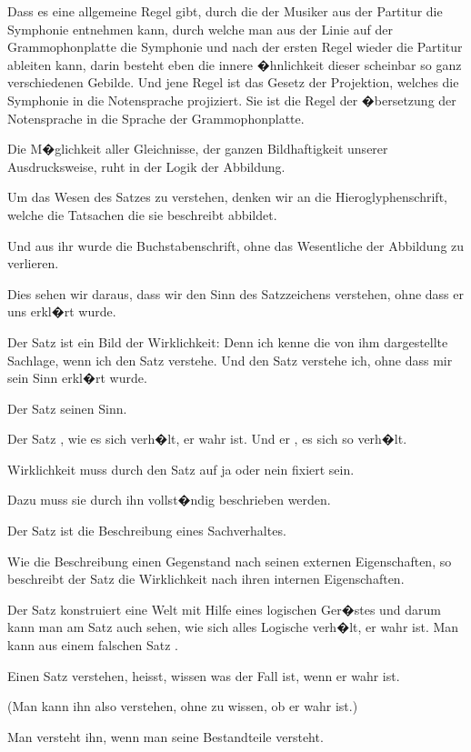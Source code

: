{Dass es eine allgemeine Regel gibt, durch die
der Musiker aus der Partitur die Symphonie
entnehmen kann, durch welche man aus der Linie
auf der Grammophonplatte die Symphonie und
nach der ersten Regel wieder die Partitur ableiten
kann, darin besteht eben die innere �hnlichkeit
dieser scheinbar so ganz verschiedenen Gebilde.
Und jene Regel ist das Gesetz der Projektion,
welches die Symphonie in die Notensprache projiziert.
Sie ist die Regel der �bersetzung der
Notensprache in die Sprache der Grammophonplatte.}


{Die M�glichkeit aller Gleichnisse, der ganzen
Bildhaftigkeit unserer Ausdrucksweise, ruht in der
Logik der Abbildung.}


{Um das Wesen des Satzes zu verstehen, denken
wir an die Hieroglyphenschrift, welche die Tatsachen
die sie beschreibt abbildet.

Und aus ihr wurde die Buchstabenschrift, ohne
das Wesentliche der Abbildung zu verlieren.}


{Dies sehen wir daraus, dass wir den Sinn des
Satzzeichens verstehen, ohne dass er uns erkl�rt
wurde.}


{Der Satz ist ein Bild der Wirklichkeit: Denn
ich kenne die von ihm dargestellte Sachlage, wenn
ich den Satz verstehe. Und den Satz verstehe ich,
ohne dass mir sein Sinn erkl�rt wurde.}


{Der Satz  seinen Sinn.

Der Satz , wie es sich verh�lt,  er
wahr ist. Und er ,  es sich so verh�lt.}


{ Wirklichkeit muss durch den Satz auf ja
oder nein fixiert sein.

Dazu muss sie durch ihn vollst�ndig beschrieben
werden.

Der Satz ist die Beschreibung eines Sachverhaltes.

Wie die Beschreibung einen Gegenstand nach
seinen externen Eigenschaften, so beschreibt der
Satz die Wirklichkeit nach ihren internen Eigenschaften.

Der Satz konstruiert eine Welt mit Hilfe eines
logischen Ger�stes und darum kann man am Satz
auch sehen, wie sich alles Logische verh�lt, 
er wahr ist. Man kann aus einem falschen Satz
.}


{Einen Satz verstehen, heisst, wissen was der
Fall ist, wenn er wahr ist.

(Man kann ihn also verstehen, ohne zu wissen,
ob er wahr ist.)

Man versteht ihn, wenn man seine Bestandteile
versteht.}


